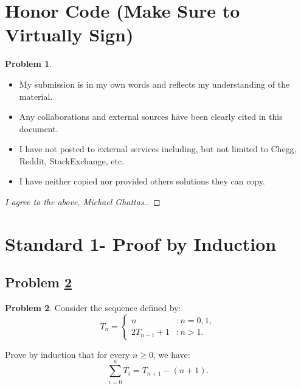 \documentclass[11pt]{article}
\theoremstyle{definition}
\theoremstyle{definition}
\newtheorem{required}{Problem}
\theoremstyle{definition}
\begin{document}
\section{Honor Code (Make Sure to Virtually Sign)} \label{HonorCode}

\begin{required}
\begin{itemize}
\item My submission is in my own words and reflects my understanding of the material.
\item Any collaborations and external sources have been clearly cited in this document.
\item I have not posted to external services including, but not limited to Chegg, Reddit, StackExchange, etc.
\item I have neither copied nor provided others solutions they can copy.
\end{itemize}

\end{required}

\begin{proof}[I agree to the above, Michael Ghattas.]
\end{proof}


\newpage
\section{Standard 1- Proof by Induction}

\subsection{Problem \ref{Induction1}}
\begin{required} \label{Induction1}
Consider the sequence defined by:
\[
T_{n} = \begin{cases} n & : n = 0, 1, \\
2T_{n-1} + 1 & : n > 1.
\end{cases}
\]

\noindent Prove by induction that for every $n \geq 0$, we have:
\[
\sum_{i=0}^{n} T_{i} = T_{n+1} - (n+1).
\]
\end{required}

\end{document}
